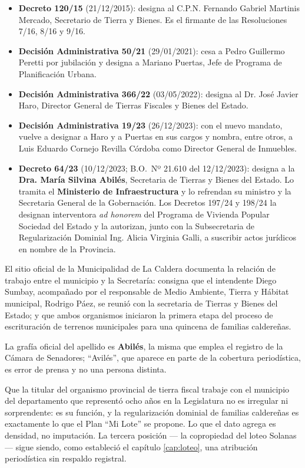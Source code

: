 \begin{itemize}[leftmargin=*,nosep]
\item \textbf{Decreto 120/15} (21/12/2015): designa al C.P.N. Fernando Gabriel Martinis Mercado, Secretario de Tierra y Bienes. Es el firmante de las Resoluciones 7/16, 8/16 y 9/16.
\item \textbf{Decisión Administrativa 50/21} (29/01/2021): cesa a Pedro Guillermo Peretti por jubilación y designa a Mariano Puertas, Jefe de Programa de Planificación Urbana.
\item \textbf{Decisión Administrativa 366/22} (03/05/2022): designa al Dr. José Javier Haro, Director General de Tierras Fiscales y Bienes del Estado.
\item \textbf{Decisión Administrativa 19/23} (26/12/2023): con el nuevo mandato, vuelve a designar a Haro y a Puertas en sus cargos y nombra, entre otros, a Luis Eduardo Cornejo Revilla Córdoba como Director General de Inmuebles.
\item \textbf{Decreto 64/23} (10/12/2023; B.O.\ Nº 21.610 del 12/12/2023): designa a la \textbf{Dra. María Silvina Abilés}, Secretaria de Tierras y Bienes del Estado. Lo tramita el \textbf{Ministerio de Infraestructura} y lo refrendan su ministro y la Secretaria General de la Gobernación. Los Decretos 197/24 y 198/24 la designan interventora \textit{ad honorem} del Programa de Vivienda Popular Sociedad del Estado y la autorizan, junto con la Subsecretaria de Regularización Dominial Ing. Alicia Virginia Galli, a suscribir actos jurídicos en nombre de la Provincia.
\end{itemize}

El sitio oficial de la Municipalidad de La Caldera documenta la relación de trabajo entre el municipio y la Secretaría: consigna que el intendente Diego Sumbay, acompañado por el responsable de Medio Ambiente, Tierra y Hábitat municipal, Rodrigo Páez, se reunió con la secretaria de Tierras y Bienes del Estado; y que ambos organismos iniciaron la primera etapa del proceso de escrituración de terrenos municipales para una quincena de familias caldereñas.

La grafía oficial del apellido es \textbf{Abilés}, la misma que emplea el registro de la Cámara de Senadores; ``Avilés'', que aparece en parte de la cobertura periodística, es error de prensa y no una persona distinta.

Que la titular del organismo provincial de tierra fiscal trabaje con el municipio del departamento que representó ocho años en la Legislatura no es irregular ni sorprendente: es su función, y la regularización dominial de familias caldereñas es exactamente lo que el Plan ``Mi Lote'' se propone. Lo que el dato agrega es densidad, no imputación. La tercera posición --- la copropiedad del loteo Solanas --- sigue siendo, como estableció el capítulo \ref{cap:loteo}, una atribución periodística sin respaldo registral.

